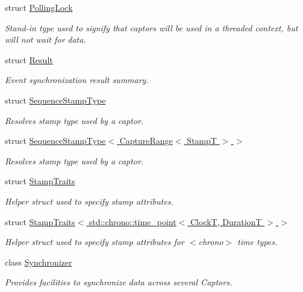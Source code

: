 \begin{DoxyCompactItemize}
struct \hyperlink{structflow_1_1_polling_lock}{Polling\+Lock}
\begin{DoxyCompactList}\small\item\em Stand-\/in type used to signify that captors will be used in a threaded context, but will not wait for data. \end{DoxyCompactList}\item 
struct \hyperlink{structflow_1_1_result}{Result}
\begin{DoxyCompactList}\small\item\em Event synchronization result summary. \end{DoxyCompactList}\item 
struct \hyperlink{structflow_1_1_sequence_stamp_type}{Sequence\+Stamp\+Type}
\begin{DoxyCompactList}\small\item\em Resolves stamp type used by a captor. \end{DoxyCompactList}\item 
struct \hyperlink{structflow_1_1_sequence_stamp_type_3_01_capture_range_3_01_stamp_t_01_4_01_4}{Sequence\+Stamp\+Type$<$ Capture\+Range$<$ Stamp\+T $>$ $>$}
\begin{DoxyCompactList}\small\item\em Resolves stamp type used by a captor. \end{DoxyCompactList}\item 
struct \hyperlink{structflow_1_1_stamp_traits}{Stamp\+Traits}
\begin{DoxyCompactList}\small\item\em Helper struct used to specify stamp attributes. \end{DoxyCompactList}\item 
struct \hyperlink{structflow_1_1_stamp_traits_3_01std_1_1chrono_1_1time__point_3_01_clock_t_00_01_duration_t_01_4_01_4}{Stamp\+Traits$<$ std\+::chrono\+::time\+\_\+point$<$ Clock\+T, Duration\+T $>$ $>$}
\begin{DoxyCompactList}\small\item\em Helper struct used to specify stamp attributes for $<$chrono$>$ time types. \end{DoxyCompactList}\item 
class \hyperlink{classflow_1_1_synchronizer}{Synchronizer}
\begin{DoxyCompactList}\small\item\em Provides facilities to synchronize data across several Captors. \end{DoxyCompactList}\end{DoxyCompactItemize}
